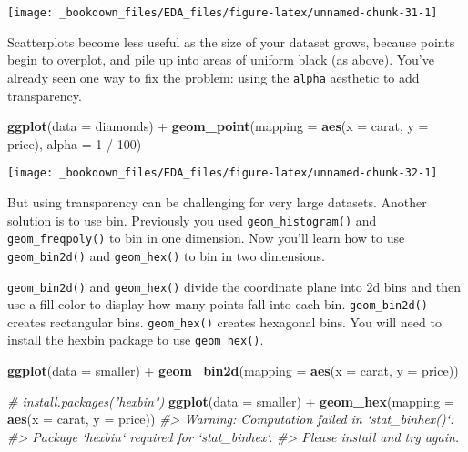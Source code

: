 \documentclass[]{book}
\newenvironment{Shaded}{\begin{snugshade}}{\end{snugshade}}
\newcommand{\KeywordTok}[1]{\textcolor[rgb]{0.13,0.29,0.53}{\textbf{{#1}}}}
\newcommand{\DataTypeTok}[1]{\textcolor[rgb]{0.13,0.29,0.53}{{#1}}}
\newcommand{\DecValTok}[1]{\textcolor[rgb]{0.00,0.00,0.81}{{#1}}}
\newcommand{\StringTok}[1]{\textcolor[rgb]{0.31,0.60,0.02}{{#1}}}
\newcommand{\CommentTok}[1]{\textcolor[rgb]{0.56,0.35,0.01}{\textit{{#1}}}}
\newcommand{\NormalTok}[1]{{#1}}
\begin{document}
\begin{center}\texttt{[image: \_bookdown\_files/EDA\_files/figure-latex/unnamed-chunk-31-1]} \end{center}

Scatterplots become less useful as the size of your dataset grows,
because points begin to overplot, and pile up into areas of uniform
black (as above). You've already seen one way to fix the problem: using
the \texttt{alpha} aesthetic to add transparency.

\begin{Shaded}
\begin{Highlighting}[]
\KeywordTok{ggplot}\NormalTok{(}\DataTypeTok{data =} \NormalTok{diamonds) +}\StringTok{ }
\StringTok{  }\KeywordTok{geom_point}\NormalTok{(}\DataTypeTok{mapping =} \KeywordTok{aes}\NormalTok{(}\DataTypeTok{x =} \NormalTok{carat, }\DataTypeTok{y =} \NormalTok{price), }\DataTypeTok{alpha =} \DecValTok{1} \NormalTok{/}\StringTok{ }\DecValTok{100}\NormalTok{)}
\end{Highlighting}
\end{Shaded}

\begin{center}\texttt{[image: \_bookdown\_files/EDA\_files/figure-latex/unnamed-chunk-32-1]} \end{center}

But using transparency can be challenging for very large datasets.
Another solution is to use bin. Previously you used
\texttt{geom\_histogram()} and \texttt{geom\_freqpoly()} to bin in one
dimension. Now you'll learn how to use \texttt{geom\_bin2d()} and
\texttt{geom\_hex()} to bin in two dimensions.

\texttt{geom\_bin2d()} and \texttt{geom\_hex()} divide the coordinate
plane into 2d bins and then use a fill color to display how many points
fall into each bin. \texttt{geom\_bin2d()} creates rectangular bins.
\texttt{geom\_hex()} creates hexagonal bins. You will need to install
the hexbin package to use \texttt{geom\_hex()}.

\begin{Shaded}
\begin{Highlighting}[]
\KeywordTok{ggplot}\NormalTok{(}\DataTypeTok{data =} \NormalTok{smaller) +}
\StringTok{  }\KeywordTok{geom_bin2d}\NormalTok{(}\DataTypeTok{mapping =} \KeywordTok{aes}\NormalTok{(}\DataTypeTok{x =} \NormalTok{carat, }\DataTypeTok{y =} \NormalTok{price))}

\CommentTok{# install.packages("hexbin")}
\KeywordTok{ggplot}\NormalTok{(}\DataTypeTok{data =} \NormalTok{smaller) +}
\StringTok{  }\KeywordTok{geom_hex}\NormalTok{(}\DataTypeTok{mapping =} \KeywordTok{aes}\NormalTok{(}\DataTypeTok{x =} \NormalTok{carat, }\DataTypeTok{y =} \NormalTok{price))}
\CommentTok{#> Warning: Computation failed in `stat_binhex()`:}
\CommentTok{#> Package `hexbin` required for `stat_binhex`.}
\CommentTok{#> Please install and try again.}
\end{Highlighting}
\end{Shaded}
\end{document}
